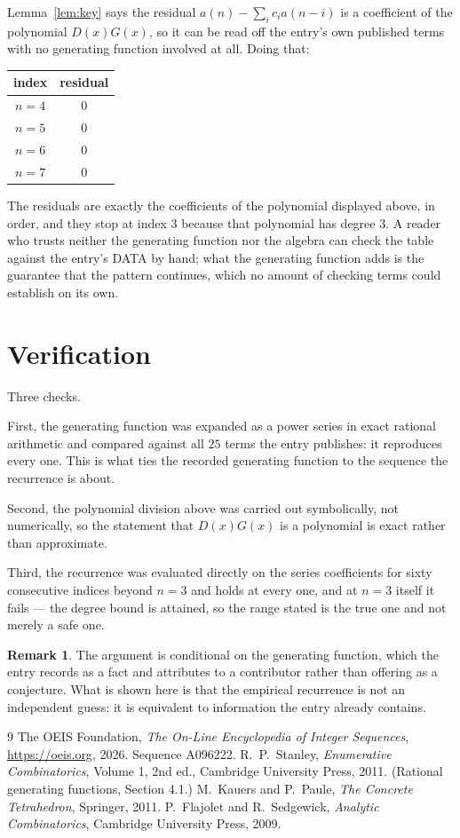 \documentclass[11pt,a4paper]{article}
\theoremstyle{plain}
\theoremstyle{definition}
\newtheorem{remark}[theorem]{Remark}
\begin{document}
Lemma~\ref{lem:key} says the residual $a(n)-\sum_ic_ia(n-i)$ is a coefficient of the
polynomial $D(x)G(x)$, so it can be read off the entry's own published terms with no
generating function involved at all. Doing that:
\begin{center}
\begin{tabular}{cc}
index & residual \\ \hline
$n=4$ & $0$ \\
$n=5$ & $0$ \\
$n=6$ & $0$ \\
$n=7$ & $0$
\end{tabular}
\end{center}
The residuals are exactly the coefficients of the polynomial displayed above, in order, and
they stop at index $3$ because that polynomial has degree $3$. A reader who trusts
neither the generating function nor the algebra can check the table against the entry's DATA
by hand; what the generating function adds is the guarantee that the pattern continues, which
no amount of checking terms could establish on its own.

\section{Verification}

Three checks.

First, the generating function was expanded as a power series in exact rational arithmetic and
compared against all $25$ terms the entry publishes: it reproduces every one. This is
what ties the recorded generating function to the sequence the recurrence is about.

Second, the polynomial division above was carried out symbolically, not numerically, so the
statement that $D(x)G(x)$ is a polynomial is exact rather than approximate.

Third, the recurrence was evaluated directly on the series coefficients for sixty consecutive
indices beyond $n=3$ and holds at every one, and at $n=3$ itself it fails --- the
degree bound is attained, so the range stated is the true one and not merely a safe one.

\begin{remark}
The argument is conditional on the generating function, which the entry records as a fact and
attributes to a contributor rather than offering as a conjecture. What is shown here is that
the empirical recurrence is not an independent guess: it is equivalent to information the
entry already contains.
\end{remark}

\begin{thebibliography}{9}
 The OEIS Foundation, \emph{The On-Line Encyclopedia of Integer
Sequences}, \url{https://oeis.org}, 2026. Sequence A096222.
 R.~P.~Stanley, \emph{Enumerative Combinatorics}, Volume 1, 2nd ed.,
Cambridge University Press, 2011. (Rational generating functions, Section 4.1.)
 M.~Kauers and P.~Paule, \emph{The Concrete Tetrahedron}, Springer, 2011.
 P.~Flajolet and R.~Sedgewick, \emph{Analytic Combinatorics}, Cambridge
University Press, 2009.
\end{thebibliography}
\end{document}
